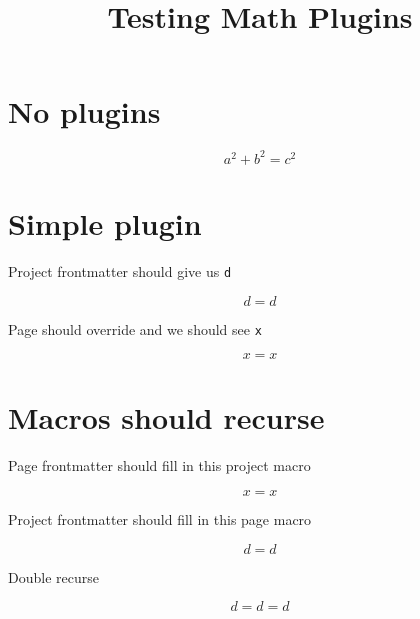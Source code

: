 \documentclass{article}
\title{Testing Math Plugins}
\date{\displaydate{articleDate}}
\author{}
\newcommand{\three}{d}
\newcommand{\one}{x}
\newcommand{\five}{x = \one}
\newcommand{\six}{d = \three}
\newcommand{\seven}{d = \six}
\begin{document}
\maketitle
\keywords{}

\section{No plugins}

\begin{equation}
a^2 + b^2 = c^2
\end{equation}

\section{Simple plugin}

Project frontmatter should give us \texttt{d}

\begin{equation}
d = \three
\end{equation}

Page should override and we should see \texttt{x}

\begin{equation}
x = \one
\end{equation}

\section{Macros should recurse}

Page frontmatter should fill in this project macro

\begin{equation}
\five
\end{equation}

Project frontmatter should fill in this page macro

\begin{equation}
\six
\end{equation}

Double recurse

\begin{equation}
\seven
\end{equation}
\end{document}
